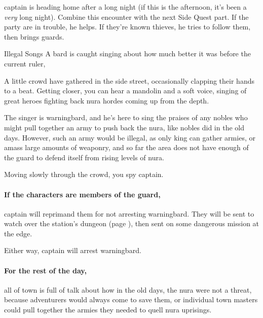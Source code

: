 \begin{multicols}{2}
\captain

\Gls{captain} is heading home after a long night (if this is the afternoon, it's been a \emph{very} long night).
Combine this encounter with the next Side Quest part.
If the party are in trouble, he helps.
If they're known thieves, he tries to follow them, then brings guards.

{Illegal Songs}%
{A bard is caught singing about how much better it was before the current ruler, }%

\begin{boxtext}
  A little crowd have gathered in the side street, occasionally clapping their hands to a beat.
  Getting closer, you can hear a mandolin and a soft voice, singing of great heroes fighting back nura hordes coming up from the depth.
\end{boxtext}

The singer is \gls{warningbard}, and he's here to sing the praises of any nobles who might pull together an army to push back the nura, like nobles did in the old days.
However, such an army would be illegal, as only \gls{king} can gather armies, or amass large amounts of weaponry, and so far the area does not have enough of the \gls{guard} to defend itself from rising levels of nura.

\begin{boxtext}

  Moving slowly through the crowd, you spy \gls{captain}.

\end{boxtext}

\paragraph{If the characters are members of the \gls{guard},}
\gls{captain} will reprimand them for not arresting \gls{warningbard}.
They will be sent to watch over the station's dungeon (page \pageref{stationDungeon}), then sent on some dangerous mission at the \gls{edge}.

Either way, \gls{captain} will arrest \gls{warningbard}.

\paragraph{For the rest of the day,}
all of \gls{town} is full of talk about how in the old days, the nura were not a threat, because adventurers would always come to save them, or individual town masters could pull together the armies they needed to quell nura uprisings.


\end{multicols}
